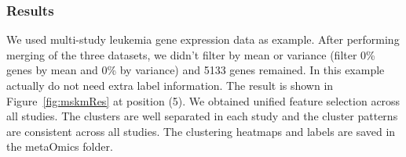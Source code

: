 \subsubsection{Results}

We used multi-study leukemia gene expression data as example.
After performing merging of the three datasets, we didn't filter by mean or variance (filter 0\% genes by mean and 0\% by variance) and 5133 genes remained.
In this example actually do not need extra label information.
The result is shown in Figure~\ref{fig:mskmRes} at position {\color{red} (5)}.
We obtained unified feature selection across all studies.
The clusters are well separated in each study and the cluster patterns are consistent across all studies.
The clustering heatmaps and labels are saved in the metaOmics folder.










